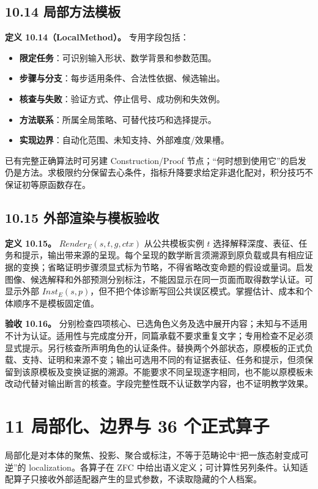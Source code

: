 \documentclass[UTF8,a4paper,zihao=-4,fontset=windows,openany]{ctexbook}
\newcommand{\mcsorigin}[1]{\par\noindent{\small\color{black!55}#1}\par\addvspace{0.8em}}
\def\operatorname#1{#1}%
\begin{document}
\section{10.14 局部方法模板}
\textbf{定义 10.14（LocalMethod）。} 专用字段包括：

\begin{itemize}
\item \textbf{限定任务}：可识别输入形状、数学背景和参数范围。
\item \textbf{步骤与分支}：每步适用条件、合法性依据、候选输出。
\item \textbf{核查与失败}：验证方式、停止信号、成功例和失效例。
\item \textbf{方法联系}：所属全局策略、可替代技巧和选择提示。
\item \textbf{实现边界}：自动化范围、未知支持、外部难度/效果槽。
\end{itemize}
已有完整正确算法时可另建 Construction/Proof 节点；“何时想到使用它”的启发仍是方法。求极限约分保留去心条件，指标升降要求给定非退化配对，积分技巧不保证初等原函数存在。

\section{10.15 外部渲染与模板验收}
\textbf{定义 10.15。} \(\operatorname{Render}_E(s,t,g,ctx)\) 从公共模板实例 \(t\) 选择解释深度、表征、任务和提示，输出带来源的呈现。每个呈现的数学断言须溯源到原负载或具有相应证据的变换；省略证明步骤须显式标为节略，不得省略改变命题的假设或量词。启发图像、候选解释和外部预测分别标注，不能因显示在同一页面而取得数学认证。可显示外部 \(\operatorname{Inst}_E(s,p)\)，但不把个体诊断写回公共误区模式。掌握估计、成本和个体顺序不是模板固定值。

\textbf{验收 10.16。} 分别检查四项核心、已选角色义务及选中展开内容；未知与不适用不计为认证。适用性与完成度分开，同篇承载不要求重复文字；专用检查不足必须显式提示。另行核查所声明角色的认证条件。替换两个外部状态，原模板的正式负载、支持、证明和来源不变；输出可选用不同的有证据表征、任务和提示，但须保留到该原模板及变换证据的溯源。不能要求不同呈现逐字相同，也不能以原模板未改动代替对输出断言的核查。字段完整性既不认证数学内容，也不证明教学效果。

\clearpage\chapter{11 局部化、边界与 36 个正式算子}
\mcsorigin{原章节：11-局部化36方案.md}
局部化是对本体的聚焦、投影、聚合或标注，不等于范畴论中“把一族态射变成可逆”的 localization。各算子在 ZFC 中给出语义定义；可计算性另列条件。认知适配算子只接收外部适配器产生的显式参数，不读取隐藏的个人档案。
\end{document}
